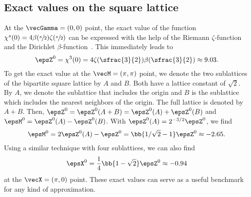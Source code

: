 \subsection{Exact values on the square lattice}
At the $\vecGamma = (0, 0)$ point, the exact value of the function
$\chi^s(0) = 4\beta(\sfrac{s}{2})\zeta(\sfrac{s}{2})$
can be expressed with the help of the Riemann $\zeta$-function and the Dirichlet $\beta$-function~\cite{Glasser1973}.
This immediately leads to
\begin{align}
    \epsZ^0 = \chi^3(0) = 4 \zeta(\sfrac{3}{2}) \beta(\sfrac{3}{2})\approx 9.03.
\end{align}
To get the exact value at the $\vecM=(\pi,\pi)$ point, we denote the two sublattices of the bipartite square lattice by $A$ and $B$. Both have a lattice constant of $\sqrt{2}$.
By $A$, we denote the sublattice that includes the origin and $B$ is the sublattice which includes the nearest neighbors of the origin. The full lattice is denoted by $A+B$.
Then, $\epsZ^0 = \epsZ^0(A+B) = \epsZ^0(A) + \epsZ^0(B)$
and
$\epsM^0 = \epsZ^0(A) - \epsZ^0(B)$. With $\epsZ^0(A)=2^{-3/2} \epsZ^0$, we find
\begin{align}
    \epsM^0 = 2\epsZ^0(A) - \epsZ^0 = \bb{ 1/\sqrt{2} - 1 } \epsZ^0 \approx -2.65.
\end{align}
Using a similar technique with four sublattices, we can also find
\begin{align}
    \epsX^0 = \frac{1}{4}\bb{ 1- \sqrt{2} } \epsZ^0 \approx -0.94
\end{align}
at the $\vecX=(\pi, 0)$ point. These exact values can serve as a useful benchmark for any kind of approximation.

